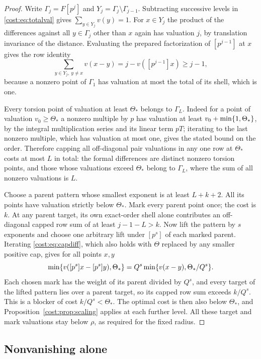 \begin{proof}
Write $\Gamma_j=F[p^j]$ and $Y_j=\Gamma_j\setminus\Gamma_{j-1}$. Subtracting successive
levels in \eqref{cost:eq:totalval} gives $\sum_{y\in Y_j}v(y)=1$. For $x\in Y_j$ the product
of the differences against all $y\in\Gamma_j$ other than $x$ again has valuation $j$, by
translation invariance of the distance. Evaluating the prepared factorization of
$[p^{j-1}]$ at $x$ gives the row identity
\[
 \sum_{y\in Y_j,\ y\ne x}v(x-y)=j-v([p^{j-1}]x)\ge j-1,
\]
because a nonzero point of $\Gamma_1$ has valuation at most the total of its shell, which
is one.

Every torsion point of valuation at least $\Theta_*$ belongs to $\Gamma_L$. Indeed for a
point of valuation $v_0\ge\Theta_*$ a nonzero multiple by $p$ has valuation at least
$v_0+\min\{1,\Theta_*\}$, by the integral multiplication series and its linear term $pT$;
iterating to the last nonzero multiple, which has valuation at most one, gives the stated
bound on the order. Therefore capping all off-diagonal pair valuations in any one row at
$\Theta_*$ costs at most $L$ in total: the formal differences are distinct nonzero torsion
points, and those whose valuations exceed $\Theta_*$ belong to $\Gamma_L$, where the sum of
all nonzero valuations is $L$.

Choose a parent pattern whose smallest exponent is at least $L+k+2$. All its points have
valuation strictly below $\Theta_*$. Mark every parent point once; the cost is $k$. At any
parent target, its own exact-order shell alone contributes an off-diagonal capped row sum of
at least $j-1-L>k$. Now lift the pattern by $s$ exponents and choose one arbitrary lift
under $[p^s]$ of each marked parent. Iterating \eqref{cost:eq:capdiff}, which also holds
with $\Theta$ replaced by any smaller positive cap, gives for all points $x,y$
\[
 \min\{v([p^s]x-[p^s]y),\Theta_*\}=Q^s\min\{v(x-y),\Theta_*/Q^s\}.
\]
Each chosen mark has the weight of its parent divided by $Q^s$, and every target of the
lifted pattern lies over a parent target, so its capped row sum exceeds $k/Q^s$. This is a
blocker of cost $k/Q^s<\Theta_*$. The optimal cost is then also below $\Theta_*$, and
Proposition~\ref{cost:prop:scaling} applies at each further level. All these target and mark valuations
stay below $\rho$, as required for the fixed radius.
\end{proof}

\subsection{Nonvanishing alone}\label{tors:sec:nonvanishing}

